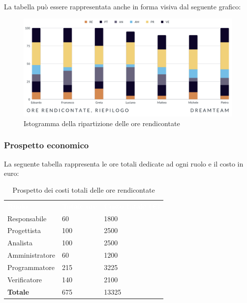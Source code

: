 La tabella può essere rappresentata anche in forma visiva dal seguente grafico:
\begin{figure}[H]
\centering
\includegraphics[scale=0.65]{Sezioni/SezioniPreventivo/grafici/Riepilogo_ore_rendicontate.png}
\caption{Istogramma della ripartizione delle ore rendicontate}
\end{figure}

\subsubsection{Prospetto economico}
La seguente tabella rappresenta le ore totali dedicate ad ogni ruolo e il costo in euro:

\begin{table}[H]
\begin{center}
\renewcommand{\arraystretch}{1.5}
\begin{tabular}{ m{}<{\centering}  m{}<{\centering} m{}<{\centering}}
	\rowcolor{darkblue}
	\textcolor{white}{\textbf{Ruolo}}&\textcolor{white}{\textbf{Totale ore}}&\textcolor{white}{\textbf{Costo totale (\euro)}}\\ 

	Responsabile  & 60 & 1800 \\	
	
	Progettista & 100 & 2500 \\
	
	Analista & 100 & 2500 \\

	Amministratore & 60 & 1200 \\
	
	Programmatore & 215 & 3225 \\
	
	Verificatore & 140 & 2100 \\
	
	\textbf{Totale} & 675 & 13325 \\
	
\end{tabular}
\caption{Prospetto dei costi totali delle ore rendicontate}
\end{center}
\end{table}

